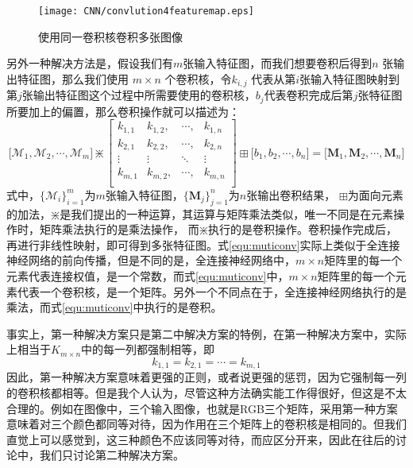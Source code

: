 \begin{figure}[!htbp]
\centering
\texttt{[image: CNN/convlution4featuremap.eps]}
\caption{使用同一卷积核卷积多张图像}
\label{img:convlution4featuremap}
\end{figure}

另外一种解决方法是，假设我们有$ m $张输入特征图，而我们想要卷积后得到$ n $ 张输出特征图，那么我们使用 $m \times n$ 个卷积核，令$ k_{i,j}$ 代表从第$ i $张输入特征图映射到第$ j $张输出特征图这个过程中所需要使用的卷积核，$ b_j $代表卷积完成后第$  j $张特征图所要加上的偏置，那么卷积操作就可以描述为：
\begin{equation}
\bigg[\mathcal{M}_1, \mathcal{M}_2, \cdots, \mathcal{M}_m\bigg] \divideontimes \left[
\begin{array}{cccc}
k_{1,1} & k_{1, 2}, & \cdots, & k_{1, n} \\
k_{2,1} & k_{2, 2}, & \cdots, & k_{2, n} \\
\vdots &\vdots & \ddots  & \vdots \\
k_{m,1} & k_{m, 2}, & \cdots, & k_{m, n} \\
\end{array}
\right ] \boxplus \bigg[b_1, b_2, \cdots, b_n\bigg] = \bigg[\mathbf{M}_1,\mathbf{M}_2, \cdots, \mathbf{M}_n\bigg]
\label{equ:muticonv}
\end{equation}
式中，$\big\{\mathcal{M}_i\big\}_{i=1}^m$为$m$张输入特征图，$\big\{\mathbf{M}_j\big\}_{j=1}^n$为$ n $张输出卷积结果， $\boxplus$为面向元素的加法，$\divideontimes $是我们提出的一种运算，其运算与矩阵乘法类似，唯一不同是在元素操作时，矩阵乘法执行的是乘法操作， 而$\divideontimes $执行的是卷积操作。卷积操作完成后，再进行非线性映射，即可得到多张特征图。式\eqref{equ:muticonv}实际上类似于全连接神经网络的前向传播，但是不同的是，全连接神经网络中，$m \times n$矩阵里的每一个元素代表连接权值，是一个常数，而式\eqref{equ:muticonv}中，$m \times n$矩阵里的每一个元素代表一个卷积核，是一个矩阵。另外一个不同点在于，全连接神经网络执行的是乘法，而式\eqref{equ:muticonv}中执行的是卷积。

事实上，第一种解决方案只是第二中解决方案的特例，在第一种解决方案中，实际上相当于$K_{m \times n}$中的每一列都强制相等，即
\begin{equation}
k_{1, 1} = k_{2, 1} = \cdots = k_{m, 1}
\end{equation}
因此，第一种解决方案意味着更强的正则，或者说更强的惩罚，因为它强制每一列的卷积核都相等。但是我个人认为，尽管这种方法确实能工作得很好，但这是不太合理的。例如在图像中，三个输入图像，也就是RGB三个矩阵，采用第一种方案意味着对三个颜色都同等对待，因为作用在三个矩阵上的卷积核是相同的。但我们直觉上可以感觉到，这三种颜色不应该同等对待，而应区分开来，因此在往后的讨论中，我们只讨论第二种解决方案。

